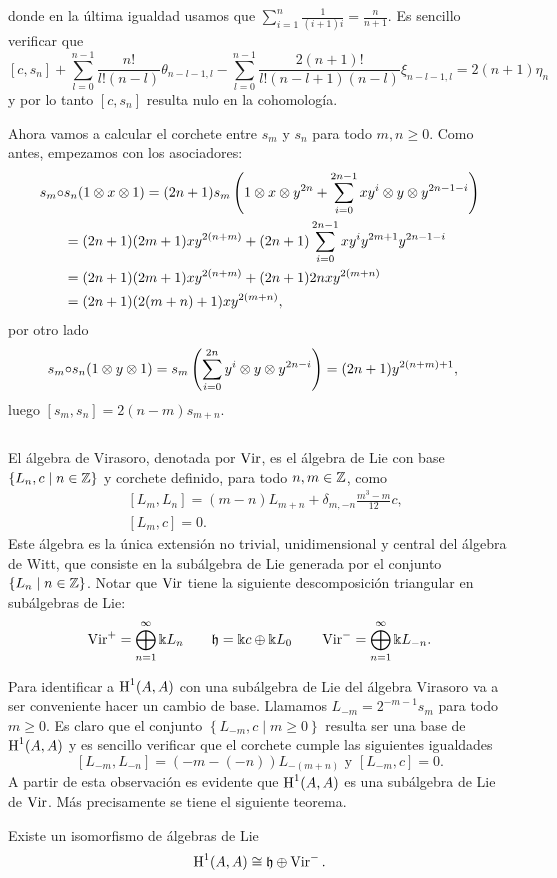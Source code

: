 \documentclass[fleqn,../tesis.tex]{subfiles}
\begin{document}
donde en la última igualdad usamos que $\sum_{i = 1 }^{n}\frac{1}{(i + 1)i} = \frac{n}{n + 1}$. Es
sencillo verificar que
\[
	\left[c, s_n\right] + \sum_{l = 0}^{n - 1}\frac{n!}{l!(n - l)}\theta_{n - l - 1, l}
	 - \sum_{l = 0}^{n - 1}\frac{2(n + 1)!}{l!(n - l + 1)(n -l)}\xi_{n - l - 1, l}= 2(n + 1)\eta_n
\]
y por lo tanto $\left[c, s_n\right]$ resulta nulo en la cohomología.

Ahora vamos a calcular el corchete entre $s_m$ y $s_n$ para todo $m, n \geq 0$. Como antes, empezamos
con los asociadores:
\begin{align*}
	s_m \circ & s_n(1 \otimes x \otimes 1)
		= (2n + 1)s_m\left(1 \otimes x \otimes y^{2n}
			+ \sum_{i = 0}^{2n - 1}xy^i \otimes y \otimes y^{2n -1 -i}\right)\\
	&= (2n + 1)(2m + 1)xy^{2(n + m)} + (2n + 1)\sum_{i = 0}^{2n - 1}xy^{i}y^{2m + 1}y^{2n - 1 -i}\\
	&= (2n + 1)(2m + 1)xy^{2(n + m)} + (2n + 1)2nxy^{2(m + n)}\\
	&= (2n + 1)(2(m +n) + 1)xy^{2(m + n)},
\end{align*}
por otro lado
\begin{align*}
	s_m \circ & s_n(1 \otimes y \otimes 1)
		=s_m\left(\sum_{i = 0}^{2n}y^{i}\otimes y \otimes y^{2n - i}\right) = (2n + 1)y^{2(n + m)+ 1},
\end{align*}
luego $\left[s_m, s_n\right] = 2(n - m)s_{m + n}$.

$ $

El álgebra de Virasoro, denotada por $\operatorname{Vir}$, es el álgebra de Lie con base
	$\left\lbrace L_n, c \mid n \in \mathbb{Z}\right\rbrace$ y corchete definido, para todo $n, m \in \mathbb{Z}$, como
\begin{align*}
	&\left[L_m, L_n\right] = (m - n)L_{m + n} + \delta_{m, -n}\frac{m^3 - m}{12}c,\\
	&\left[L_m, c\right] = 0.	
\end{align*}
Este álgebra es la única extensión no trivial, unidimensional y central del álgebra de Witt, que consiste
en la subálgebra de Lie generada por el conjunto $\left\lbrace L_n \mid n \in \mathbb{Z}\right\rbrace$.
Notar que $\operatorname{Vir}$ tiene la siguiente descomposición triangular en subálgebras de Lie:
\begin{align*}
	\operatorname{Vir}^{+} = \bigoplus_{n = 1}^{\infty}\Bbbk L_n \qquad
	\mathfrak{h} = \Bbbk c \oplus \Bbbk L_0 \qquad
	\operatorname{Vir}^{-} = \bigoplus_{n = 1}^{\infty}\Bbbk L_{-n}.
\end{align*}

Para identificar a $\operatorname{H}^{1}(A,A)$ con una subálgebra de Lie del álgebra Virasoro va a ser conveniente
hacer un cambio de base. Llamamos $L_{-m} = 2^{- m - 1}s_m$ para todo $m \geq 0$. Es claro
que el conjunto $\left\lbrace L_{-m}, c \mid m \geq 0 \right\rbrace$ resulta ser una base de $\operatorname{H}^{1}(A,A)$
y es sencillo verificar que el corchete cumple las siguientes igualdades
\[
	\left[L_{-m}, L_{-n}\right] = (-m - (-n))L_{-(m + n)} \text{ y } \left[L_{-m}, c\right] = 0.	
\]
A partir de esta observación es evidente que $\operatorname{H}^{1}(A,A)$ es una subálgebra de Lie de $\operatorname{Vir}$.
Más precisamente se tiene el siguiente teorema.
\begin{Teorema} \label{teo_lie}
Existe un isomorfismo de álgebras de Lie
\[
	\operatorname{H}^{1}(A,A) \cong \mathfrak{h} \oplus \operatorname{Vir}^{-}.
\]
\end{Teorema}
\end{document}
